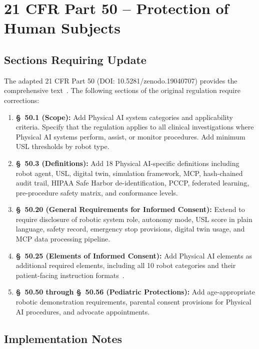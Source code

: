 \documentclass[11pt,letterpaper]{article}
\begin{document}
\section{21 CFR Part 50 -- Protection of Human Subjects}

\subsection{Sections Requiring Update}

The adapted 21 CFR Part 50 (DOI: 10.5281/zenodo.19040707) provides the
comprehensive text~\cite{cfr50adapt}. The following sections of the original
regulation require corrections:

\begin{enumerate}[label=(\alph*)]
\item \textbf{\S~50.1 (Scope):} Add Physical AI system categories and
  applicability criteria. Specify that the regulation applies to all clinical
  investigations where Physical AI systems perform, assist, or monitor
  procedures. Add minimum USL thresholds by robot type.

\item \textbf{\S~50.3 (Definitions):} Add 18 Physical AI-specific definitions
  including robot agent, USL, digital twin, simulation framework, MCP,
  hash-chained audit trail, HIPAA Safe Harbor de-identification, PCCP,
  federated learning, pre-procedure safety matrix, and conformance levels.

\item \textbf{\S~50.20 (General Requirements for Informed Consent):} Extend
  to require disclosure of robotic system role, autonomy mode, USL score in
  plain language, safety record, emergency stop provisions, digital twin usage,
  and MCP data processing pipeline.

\item \textbf{\S~50.25 (Elements of Informed Consent):} Add Physical AI
  elements as additional required elements, including all 10 robot categories
  and their patient-facing instruction formats~\cite{patientinstructions2026}.

\item \textbf{\S~50.50 through \S~50.56 (Pediatric Protections):} Add
  age-appropriate robotic demonstration requirements, parental consent
  provisions for Physical AI procedures, and advocate appointments.
\end{enumerate}

\subsection{Implementation Notes}
\end{document}
